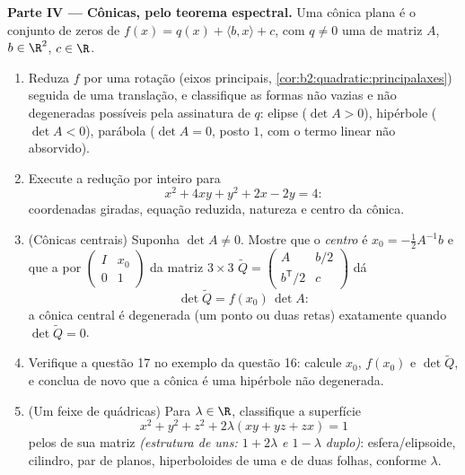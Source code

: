 \begin{problem}
\medskip
\noindent\textbf{Parte IV --- Cônicas, pelo teorema espectral.}
Uma cônica plana é o conjunto de zeros de $f(x) = q(x) + \langle b,
x\rangle + c$, com $q \neq 0$ uma  de matriz $A$,
$b \in \R^2$, $c \in \R$.
\begin{enumerate}[resume]
  \item Reduza $f$ por uma rotação (eixos principais,
        \cref{cor:b2:quadratic:principalaxes}) seguida de uma
        translação, e classifique as formas não vazias e
        não degeneradas possíveis pela assinatura de $q$: elipse
        ($\det A > 0$), hipérbole ($\det A < 0$), parábola
        ($\det A = 0$, posto $1$, com o termo linear não
        absorvido).
  \item Execute a redução por inteiro para
        \[
        x^2 + 4xy + y^2 + 2x - 2y = 4 :
        \]
        coordenadas giradas, equação reduzida, natureza e
        centro da cônica.
  \item (Cônicas centrais) Suponha $\det A \neq 0$. Mostre que o
        \emph{centro} é $x_0 = -\frac12 A^{-1}b$ e que a
         por $\begin{pmatrix} I & x_0\\ 0 &
        1\end{pmatrix}$ da matriz $3\times3$ $\widetilde Q
        = \begin{pmatrix} A & b/2 \\ b^{\mathsf T}/2 &
        c\end{pmatrix}$ dá
        \[
        \det\widetilde Q = f(x_0)\,\det A :
        \]
        a cônica central é degenerada (um ponto ou duas retas)
        exatamente quando $\det\widetilde Q = 0$.
  \item Verifique a questão 17 no exemplo da questão 16:
        calcule $x_0$, $f(x_0)$ e $\det\widetilde Q$, e
        conclua de novo que a cônica é uma hipérbole não
        degenerada.
  \item (Um feixe de quádricas) Para $\lambda \in \R$, classifique a
        superfície
        \[
        x^2 + y^2 + z^2 + 2\lambda(xy + yz + zx) = 1
        \]
        pelos  de sua matriz \emph{(estrutura de
        uns:  $1 + 2\lambda$ e $1 -
        \lambda$ duplo)}: esfera/elipsoide, cilindro, par de
        planos, hiperboloides de uma e de duas folhas, conforme
        $\lambda$.
\end{enumerate}


\end{problem}
